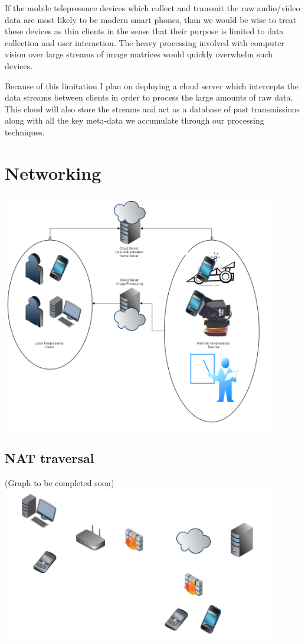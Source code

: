\documentclass[a4paper,12pt]{report}
\begin{document}
If the mobile telepresence devices which collect and transmit the raw audio/video data are most likely to be modern smart phones, than we would be wise to treat these devices as thin clients in the sense that their purpose is limited to data collection and user interaction. The heavy processing involved with computer vision over large streams of image matrices would quickly overwhelm such devices.

Because of this limitation I plan on deploying a cloud server which intercepts the data streams between clients in order to process the large amounts of raw data. This cloud will also store the streams and act as a database of past transmissions along with all the key meta-data we accumulate through our processing techniques.

\section{Networking}

\includegraphics[width=12cm]{overview}
	\subsection{NAT traversal}
		(Graph to be completed soon)
		\includegraphics[width=12cm]{networkModel}
\end{document}
